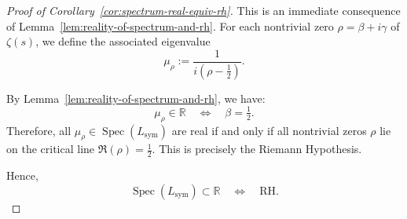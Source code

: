 \begin{proof}[Proof of Corollary~\ref{cor:spectrum-real-equiv-rh}]
This is an immediate consequence of Lemma~\ref{lem:reality-of-spectrum-and-rh}. For each nontrivial zero \( \rho = \beta + i\gamma \) of \( \zeta(s) \), we define the associated eigenvalue
\[
\mu_\rho := \frac{1}{i(\rho - \tfrac{1}{2})}.
\]

By Lemma~\ref{lem:reality-of-spectrum-and-rh}, we have:
\[
\mu_\rho \in \mathbb{R} \quad \Longleftrightarrow \quad \beta = \tfrac{1}{2}.
\]
Therefore, all \( \mu_\rho \in \operatorname{Spec}(L_{\mathrm{sym}}) \) are real if and only if all nontrivial zeros \( \rho \) lie on the critical line \( \Re(\rho) = \tfrac{1}{2} \). This is precisely the Riemann Hypothesis.

Hence,
\[
\operatorname{Spec}(L_{\mathrm{sym}}) \subset \mathbb{R} \quad \iff \quad \mathrm{RH}.
\]
\end{proof}
% 